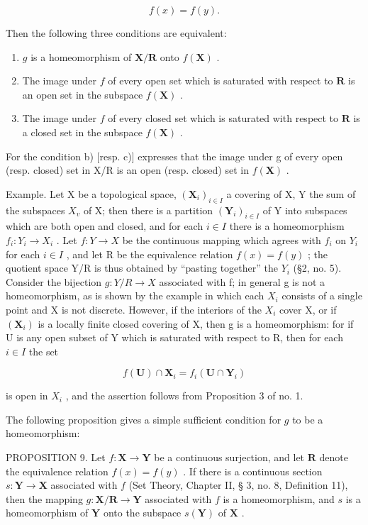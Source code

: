 \[
f (x) = f (y).
\]

Then the following three conditions are equivalent:

\begin{enumerate}
\def\labelenumi{\alph{enumi})}
\item
  \(g\) is a homeomorphism of \(\mathbf{X} / \mathbf{R}\) onto \(f(\mathbf{X})\) .
\item
  The image under \(f\) of every open set which is saturated with respect to \(\mathbf{R}\) is an open set in the subspace \(f(\mathbf{X})\) .
\item
  The image under \(f\) of every closed set which is saturated with respect to \(\mathbf{R}\) is a closed set in the subspace \(f(\mathbf{X})\) .
\end{enumerate}

For the condition b) {[}resp. c){]} expresses that the image under g of every open (resp. closed) set in X/R is an open (resp. closed) set in \(f(\mathbf{X})\) .

Example. Let X be a topological space, \((\mathbf{X}_{i})_{i\in I}\) a covering of X, Y the sum of the subspaces \(X_{v}\) of X; then there is a partition \((\mathbf{Y}_{i})_{i\in I}\) of Y into subspaces which are both open and closed, and for each \(i\in I\) there is a homeomorphism \(f_{i}:Y_{i}\to X_{i}\) . Let \(f:Y\to X\) be the continuous mapping which agrees with \(f_{i}\) on \(Y_{i}\) for each \(i\in I\) , and let R be the equivalence relation \(f(x)=f(y)\) ; the quotient space Y/R is thus obtained by ``pasting together'' the \(Y_{i}\) (§2, no. 5). Consider the bijection \(g:Y/R\to X\) associated with f; in general g is not a homeomorphism, as is shown by the example in which each \(X_{i}\) consists of a single point and X is not discrete. However, if the interiors of the \(X_{i}\) cover X, or if \((\mathbf{X}_{i})\) is a locally finite closed covering of X, then g is a homeomorphism: for if U is any open subset of Y which is saturated with respect to R, then for each \(i\in I\) the set

\[
f (\mathbf {U}) \cap \mathbf {X} _ {i} = f _ {i} (\mathbf {U} \cap \mathbf {Y} _ {i})
\]

is open in \(X_{i}\) , and the assertion follows from Proposition 3 of no. 1.

The following proposition gives a simple sufficient condition for \(g\) to be a homeomorphism:

PROPOSITION 9. Let \(f: \mathbf{X} \to \mathbf{Y}\) be a continuous surjection, and let \(\mathbf{R}\) denote the equivalence relation \(f(x) = f(y)\) . If there is a continuous section \(s: \mathbf{Y} \to \mathbf{X}\) associated with \(f\) (Set Theory, Chapter II, § 3, no. 8, Definition 11), then the mapping \(g: \mathbf{X} / \mathbf{R} \to \mathbf{Y}\) associated with \(f\) is a homeomorphism, and \(s\) is a homeomorphism of \(\mathbf{Y}\) onto the subspace \(s(\mathbf{Y})\) of \(\mathbf{X}\) .

